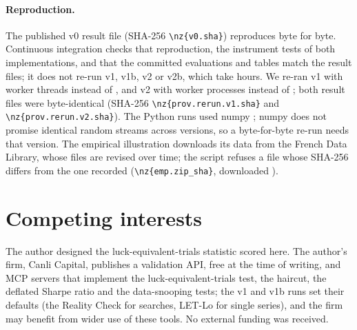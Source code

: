 \paragraph{Reproduction.} The published v0 result file (SHA-256 \nolinkurl{\nz{v0.sha}}) reproduces byte for byte. Continuous integration checks that reproduction, the instrument tests of both implementations, and that the committed evaluations and tables match the result files; it does not re-run v1, v1b, v2 or v2b, which take hours. We re-ran v1 with  worker threads instead of , and v2 with  worker processes instead of ; both result files were byte-identical (SHA-256 \nolinkurl{\nz{prov.rerun.v1.sha}} and \nolinkurl{\nz{prov.rerun.v2.sha}}). The Python runs used numpy ; numpy does not promise identical random streams across versions, so a byte-for-byte re-run needs that version. The empirical illustration downloads its data from the French Data Library, whose files are revised over time; the script refuses a file whose SHA-256 differs from the one recorded (\nolinkurl{\nz{emp.zip_sha}}, downloaded ).

\section*{Competing interests}
The author designed the luck-equivalent-trials statistic scored here. The author's firm, Canli Capital, publishes a validation API, free at the time of writing, and MCP servers that implement the luck-equivalent-trials test, the haircut, the deflated Sharpe ratio and the data-snooping tests; the v1 and v1b runs set their defaults (the Reality Check for searches, LET-Lo for single series), and the firm may benefit from wider use of these tools. No external funding was received.
